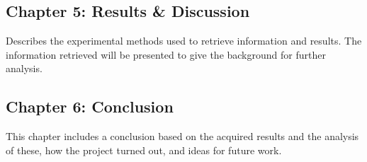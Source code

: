 \subsection*{Chapter 5: Results \& Discussion}
Describes the experimental methods used to retrieve information and results. The information retrieved will be presented to give the background for further analysis.

\subsection*{Chapter 6: Conclusion}
This chapter includes a conclusion based on the acquired results and the analysis of these, how the project turned out, and ideas for future work.

\cleardoublepage